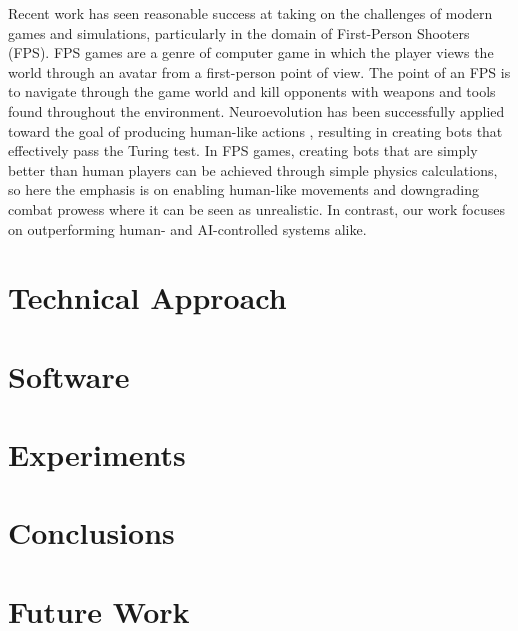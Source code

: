 \documentclass[a4paper]{article}
\begin{document}
Recent work has seen reasonable success at taking on the challenges of modern games and simulations, particularly in the domain of First-Person Shooters (FPS). FPS games are a genre of computer game in which the player views the world through an avatar from a first-person point of view. The point of an FPS is to navigate through the game world and kill opponents with weapons and tools found throughout the environment. Neuroevolution has been successfully applied toward the goal of producing human-like actions \cite{schrum:cig11competition}, resulting in creating bots that effectively pass the Turing test. In FPS games, creating bots that are simply better than human players can be achieved through simple physics calculations, so here the emphasis is on enabling human-like movements and downgrading combat prowess where it can be seen as unrealistic. In contrast, our work focuses on outperforming human- and AI-controlled systems alike.

\section{Technical Approach}
\label{sec:tech}

\section{Software}
\label{sec:soft}

\section{Experiments}
\label{sec:exp}

\section{Conclusions}
\label{sec:conclusion}

\section{Future Work}
\label{sec:future}



\end{document}
